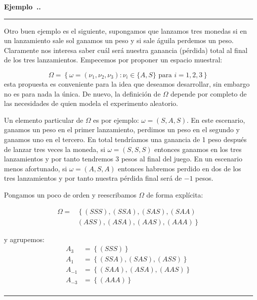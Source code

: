 \documentclass{extreport}
\newcounter{example}[chapter]
\newenvironment{example}[1][]{\refstepcounter{example}\par\medskip
   \noindent\textbf{Ejemplo~\thechapter.\theexample. #1 }\par\medskip\hrule \rmfamily\par\medskip}{\medskip\hrule\medskip}
\theoremstyle{definicion}
\theoremstyle{propiedad}
\theoremstyle{teorema}
\begin{document}
\begin{example}\label{ex:1}
Otro buen ejemplo es el siguiente, supongamos que lanzamos tres monedas si en un lanzamiento sale sol ganamos un peso y si sale águila perdemos un peso. Claramente nos interesa saber cuál será nuestra ganancia (pérdida) total al final de los tres lanzamientos. Empecemos por proponer un espacio muestral:

$$
\Omega = \left\{\omega = (\nu_1, \nu_2, \nu_3): \nu_i \in\{A,S\}\text{ para } i = 1,2,3 \right\}
$$
esta propuesta es conveniente para la idea que deseamos desarrollar, sin embargo no es para nada la única. De nuevo, la definición de $\Omega$ depende por completo de las necesidades de quien modela el experimento aleatorio.

Un elemento particular de $\Omega$ es por ejemplo: $\omega = (S,A,S)$. En este escenario, ganamos un peso en el primer lanzamiento, perdimos un peso en el segundo y ganamos uno en el tercero. En total tendríamos una ganancia de 1 peso después de lanzar tres veces la moneda,  si  $\omega = (S,S,S)$ entonces ganamos en los tres lanzamientos y por tanto tendremos 3 pesos al final del juego. En un escenario menos afortunado, si $\omega = (A,S,A)$ entonces habremos perdido en dos de los tres lanzamientos y por tanto nuestra pérdida final será de $-1$ pesos. 

Pongamos un poco de orden y reescribamos $\Omega$ de forma explícita:

\begin{align*}
        \Omega =  & \left\{(SSS), (SSA), (SAS), (SAA) \right.\\
                  & \left. (ASS), (ASA), (AAS), (AAA) \right\}
\end{align*}

y agrupemos:
\begin{equation*}
    \begin{split}
        A_3 & = \left\{(SSS)\right\}\\
        A_1 & = \left\{(SSA), (SAS), (ASS)\right\}\\
        A_{-1} & = \left\{(SAA), (ASA), (AAS)\right\}\\
        A_{-3} & = \left\{(AAA)\right\}\\
    \end{split}
\end{equation*}


\end{example}
\end{document}
